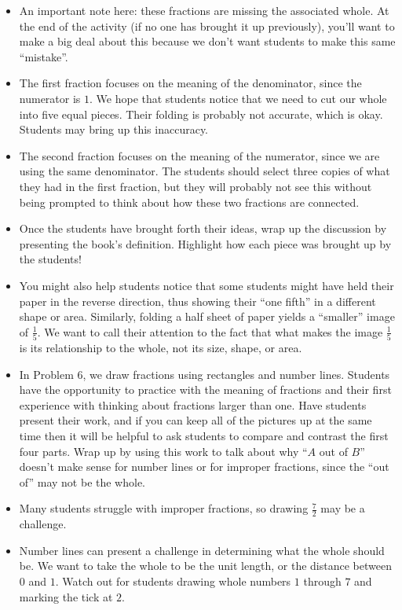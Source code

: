 \documentclass[nooutcomes,noauthor,handout]{ximera}
\begin{document}
\begin{instructorNotes}
\begin{itemize}
	\item An important note here: these fractions are missing the associated whole. At the end of the activity (if no one has brought it up previously), you'll want to make a big deal about this because we don't want students to make this same ``mistake''.
	\item The first fraction focuses on the meaning of the denominator, since the numerator is $1$. We hope that students notice that we need to cut our whole into five equal pieces. Their folding is probably not accurate, which is okay. Students may bring up this inaccuracy.
	\item The second fraction focuses on the meaning of the numerator, since we are using the same denominator. The students should select three copies of what they had in the first fraction, but they will probably not see this without being prompted to think about how these two fractions are connected.
	\item Once the students have brought forth their ideas, wrap up the discussion by presenting the book's definition. Highlight how each piece was brought up by the students!
	\item You might also help students notice that some students might have held their paper in the reverse direction, thus showing their ``one fifth'' in a different shape or area.  Similarly, folding a half sheet of paper yields a ``smaller'' image of $\frac15$.  We want to call their attention to the fact that what makes the image $\frac15$ is its relationship to the whole, not its size, shape, or area.
	\item In Problem 6, we draw fractions using rectangles and number lines. Students have the opportunity to practice with the meaning of fractions and their first experience with thinking about fractions larger than one. Have students present their work, and if you can keep all of the pictures up at the same time then it will be helpful to ask students to compare and contrast the first four parts. Wrap up by using this work to talk about why ``$A$ out of $B$'' doesn't make sense for number lines or for improper fractions, since the ``out of'' may not be the whole. 
	\item Many students struggle with improper fractions, so drawing $\frac{7}{2}$ may be a challenge.
	\item Number lines can present a challenge in determining what the whole should be. We want to take the whole to be the unit length, or the distance between $0$ and $1$. Watch out for students drawing whole numbers $1$ through $7$ and marking the tick at $2$.

\end{itemize}
\end{instructorNotes}
\end{document}
